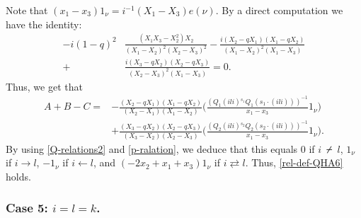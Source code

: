 \documentclass[11pt, reqno]{amsart} \textwidth=14.9cm \oddsidemargin=1cm \evensidemargin=1cm
\theoremstyle{definition}
\def\nslash{\:\notslash\:}
\numberwithin{equation}{section}
\begin{document}
Note that $(x_{1}-x_{3})1_{\nu}=i^{-1}(X_{1}-X_{3})e(\nu).$ By a direct computation we have the identity:
\begin{align*}
-i(1-q)^2& \frac{(X_1X_3-X_2^2)X_2}{(X_1-X_2)^2
(X_2-X_3)^2}
-\frac{i(X_2-qX_1)(X_1-qX_2)}{(X_1-X_2)^2(X_1-X_3)}\\
+&\frac{i(X_3-qX_2)(X_2-qX_3)}{(X_2-X_3)^2(X_1-X_3)}=0.
\end{align*}
Thus, we get that
\begin{align*}
A+B-C=&-\frac{(X_{2}-qX_1)(X_1-qX_{2})}{(X_{2}-X_{1})(X_{1}-X_{2})}\big(\frac{(Q_{1}(ili){}^{s_{1}}Q_{1}(s_{1}\cdot(ili)))^{-1}}{x_{1}-x_{3}}1_{\nu}\big)\\
&+\frac{(X_{3}-qX_2)(X_2-qX_{3})}{(X_{3}-X_{2})(X_{2}-X_{3})}\big(\frac{(Q_{2}(ili){}^{s_{2}}Q_{2}(s_{2}\cdot(ili)))^{-1}}{x_{1}-x_{3}}1_{\nu}\big).
\end{align*}
By using \eqref{Q-relations2} and \eqref{p-ralation}, we deduce that this equals 0 if $i\nslash l$, $1_{\nu}$ if $i\rightarrow l$, $-1_{\nu}$ if $i\leftarrow l$, and $(-2x_2+x_1+x_3)1_{\nu}$ if $i\rightleftarrows l.$ Thus, \eqref{rel-def-QHA6} holds.


\subsubsection*{Case 5: $i=l=k$.}

\
\end{document}

